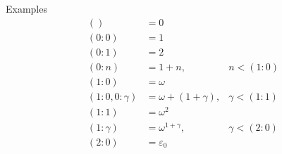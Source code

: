 \documentclass{article}
\newcommand{\w}{\omega}
\newcommand{\e}{\varepsilon}
\begin{document}


Examples \\
\begin{align*}
  () &= 0 \\
  (0: 0) &= 1 \\
  (0: 1) &= 2 \\
  (0: n) &= 1+n, & n < (1: 0) \\
  (1: 0) &= \w \\
  (1: 0, 0: \gamma) &= \w+(1+\gamma), & \gamma < (1: 1) \\
  (1: 1) &= \w^2 \\
  (1: \gamma) &= \w^{1+\gamma}, & \gamma < (2: 0) \\
  (2: 0) &= \e_0 \\
\end{align*}
\end{document}
